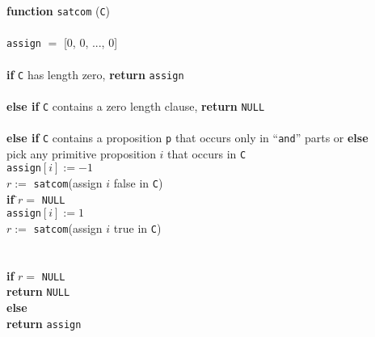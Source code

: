 \documentclass[12pt]{article}
\begin{document}
\vspace*{2ex}


\begin{tabbing}
{\bf fu}\={\bf nction} {\tt satcom} ({\tt C})
\\
\\
\> {\tt assign} $=$ [0, 0, ..., 0]
\\
\\
\> {\bf if} {\tt C} has length zero, {\bf return} {\tt assign}
\\
\\
\> {\bf else if} 
{\tt C} contains a zero length clause, {\bf return} {\tt NULL}
\\
\\
\> {\bf else if}
\={\tt C} contains a proposition {\tt p} that occurs only in ``{\tt and}'' parts or %
\kill
\> {\bf else}
\\
\>\>
pick any primitive proposition $i$ that occurs in {\tt C}
\\
\>\> {\tt assign}$[i] :=  -1$
\\
\>\> $r :=$ {\tt satcom}(assign $i$ false in {\tt C})
\\
\>\> {\bf if} \=$r=$ {\tt NULL}
\\
\>\>\> {\tt assign}$[i] := 1$
\\
\>\>\> $r :=$ {\tt satcom}(assign $i$ true in {\tt C})
\\
\\
\\
\> {\bf if} $r=$ {\tt NULL}
\\
\>\> {\bf return} {\tt NULL}
\\
\> {\bf else}
\\
\>\> {\bf return} {\tt assign}
\end{tabbing}
\end{document}
